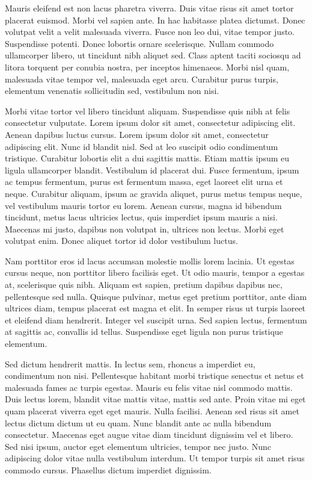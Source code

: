 Mauris eleifend est non lacus pharetra viverra. Duis vitae risus sit amet tortor placerat euismod. Morbi vel sapien ante. In hac habitasse platea dictumst. Donec volutpat velit a velit malesuada viverra. Fusce non leo dui, vitae tempor justo. Suspendisse potenti. Donec lobortis ornare scelerisque. Nullam commodo ullamcorper libero, ut tincidunt nibh aliquet sed. Class aptent taciti sociosqu ad litora torquent per conubia nostra, per inceptos himenaeos. Morbi nisl quam, malesuada vitae tempor vel, malesuada eget arcu. Curabitur purus turpis, elementum venenatis sollicitudin sed, vestibulum non nisi.

Morbi vitae tortor vel libero tincidunt aliquam. Suspendisse quis nibh at felis consectetur vulputate. Lorem ipsum dolor sit amet, consectetur adipiscing elit. Aenean dapibus luctus cursus. Lorem ipsum dolor sit amet, consectetur adipiscing elit. Nunc id blandit nisl. Sed at leo suscipit odio condimentum tristique. Curabitur lobortis elit a dui sagittis mattis. Etiam mattis ipsum eu ligula ullamcorper blandit. Vestibulum id placerat dui. Fusce fermentum, ipsum ac tempus fermentum, purus est fermentum massa, eget laoreet elit urna et neque. Curabitur aliquam, ipsum ac gravida aliquet, purus metus tempus neque, vel vestibulum mauris tortor eu lorem. Aenean cursus, magna id bibendum tincidunt, metus lacus ultricies lectus, quis imperdiet ipsum mauris a nisi. Maecenas mi justo, dapibus non volutpat in, ultrices non lectus. Morbi eget volutpat enim. Donec aliquet tortor id dolor vestibulum luctus.

Nam porttitor eros id lacus accumsan molestie mollis lorem lacinia. Ut egestas cursus neque, non porttitor libero facilisis eget. Ut odio mauris, tempor a egestas at, scelerisque quis nibh. Aliquam est sapien, pretium dapibus dapibus nec, pellentesque sed nulla. Quisque pulvinar, metus eget pretium porttitor, ante diam ultrices diam, tempus placerat est magna et elit. In semper risus ut turpis laoreet et eleifend diam hendrerit. Integer vel suscipit urna. Sed sapien lectus, fermentum at sagittis ac, convallis id tellus. Suspendisse eget ligula non purus tristique elementum.

Sed dictum hendrerit mattis. In lectus sem, rhoncus a imperdiet eu, condimentum non nisi. Pellentesque habitant morbi tristique senectus et netus et malesuada fames ac turpis egestas. Mauris eu felis vitae nisl commodo mattis. Duis lectus lorem, blandit vitae mattis vitae, mattis sed ante. Proin vitae mi eget quam placerat viverra eget eget mauris. Nulla facilisi. Aenean sed risus sit amet lectus dictum dictum ut eu quam. Nunc blandit ante ac nulla bibendum consectetur. Maecenas eget augue vitae diam tincidunt dignissim vel et libero. Sed nisi ipsum, auctor eget elementum ultricies, tempor nec justo. Nunc adipiscing dolor vitae nulla vestibulum interdum. Ut tempor turpis sit amet risus commodo cursus. Phasellus dictum imperdiet dignissim.

